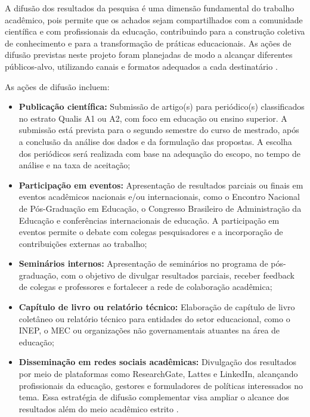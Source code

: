 A difusão dos resultados da pesquisa é uma dimensão fundamental do trabalho acadêmico, pois permite que os achados sejam compartilhados com a comunidade científica e com profissionais da educação, contribuindo para a construção coletiva de conhecimento e para a transformação de práticas educacionais. As ações de difusão previstas neste projeto foram planejadas de modo a alcançar diferentes públicos-alvo, utilizando canais e formatos adequados a cada destinatário \cite{SANTOS2024}.

As ações de difusão incluem:

\begin{itemize}
    \item \textbf{Publicação científica:} Submissão de artigo(s) para periódico(s) classificados no estrato Qualis A1 ou A2, com foco em educação ou ensino superior. A submissão está prevista para o segundo semestre do curso de mestrado, após a conclusão da análise dos dados e da formulação das propostas. A escolha dos periódicos será realizada com base na adequação do escopo, no tempo de análise e na taxa de aceitação;
    \item \textbf{Participação em eventos:} Apresentação de resultados parciais ou finais em eventos acadêmicos nacionais e/ou internacionais, como o Encontro Nacional de Pós-Graduação em Educação, o Congresso Brasileiro de Administração da Educação e conferências internacionais de educação. A participação em eventos permite o debate com colegas pesquisadores e a incorporação de contribuições externas ao trabalho;
    \item \textbf{Seminários internos:} Apresentação de seminários no programa de pós-graduação, com o objetivo de divulgar resultados parciais, receber feedback de colegas e professores e fortalecer a rede de colaboração acadêmica;
    \item \textbf{Capítulo de livro ou relatório técnico:} Elaboração de capítulo de livro coletâneo ou relatório técnico para entidades do setor educacional, como o INEP, o MEC ou organizações não governamentais atuantes na área de educação;
    \item \textbf{Disseminação em redes sociais acadêmicas:} Divulgação dos resultados por meio de plataformas como ResearchGate, Lattes e LinkedIn, alcançando profissionais da educação, gestores e formuladores de políticas interessados no tema. Essa estratégia de difusão complementar visa ampliar o alcance dos resultados além do meio acadêmico estrito \cite{BARDIN2016}.
\end{itemize}


